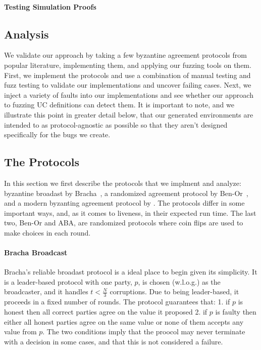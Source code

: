 \paragraph{Testing Simulation Proofs}


\subsection{Analysis}
We validate our approach by taking a few byzantine agreement protocols from popular literature, implementing them, and applying our fuzzing tools on them. 
First, we implement the protocols and use a combination of manual testing and fuzz testing to validate our implementations and uncover failing cases. 
Next, we inject a variety of faults into our implementations and see whether our approach to fuzzing UC definitions can detect them.
It is important to note, and we illustrate this point in greater detail below, that our generated environments are intended to as protocol-agnostic as possible so that they aren't designed specifically for the bugs we create.

\subsection{The Protocols}
In this section we first describe the protocols that we implment and analyze: byzantine broadast by Bracha~\cite{bracha}, a randomized agreement protocol by Ben-Or~\cite{Ben-Or}, and a modern byzanting agreement protocol by \cite{who}.
The protocols differ in some important ways, and, as it comes to liveness, in their expected run time.
The last two, Ben-Or and ABA, are randomized protocols where coin flips are used to make choices in each round. 

\paragraph{Bracha Broadcast}
Bracha's reliable broadast protocol is a ideal place to begin given its simplicity.
It is a leader-based protocol with one party, $p$, is chosen (w.l.o.g.) as the broadcaster, and it handles $t < \frac{N}{3}$ corruptions.
Due to being leader-based, it proceeds in a fixed number of rounds.
The protocol guarantees that: 1. if $p$ is honest then all correct parties agree on the value it proposed 2. if $p$ is faulty then either all honest parties agree on the same value or none of them accepts any value from $p$. 
The two conditions imply that the proocol may never terminate with a decision in some cases, and that this is not considered a failure. 


